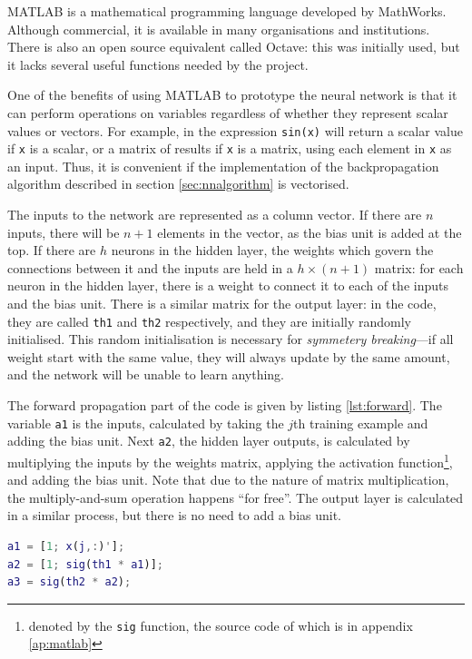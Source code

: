 MATLAB is a mathematical programming language developed by MathWorks.  Although commercial, it is available in many organisations and institutions.  There is also an open source equivalent called Octave: this was initially used, but it lacks several useful functions needed by the project.

One of the benefits of using MATLAB to prototype the neural network is that it can perform operations on variables regardless of whether they represent scalar values or vectors.  For example, in the expression {\tt sin(x)} will return a scalar value if {\tt x} is a scalar, or a matrix of results if {\tt x} is a matrix, using each element in {\tt x} as an input.  Thus, it is convenient if the implementation of the backpropagation algorithm described in section \ref{sec:nnalgorithm} is vectorised.

The inputs to the network are represented as a column vector.  If there are $n$ inputs, there will be $n + 1$ elements in the vector, as the bias unit is added at the top.  If there are $h$ neurons in the hidden layer, the weights which govern the connections between it and the inputs are held in a $h \times (n + 1)$ matrix: for each neuron in the hidden layer, there is a weight to connect it to each of the inputs and the bias unit.  There is a similar matrix for the output layer: in the code, they are called {\tt th1} and {\tt th2} respectively, and they are initially randomly initialised.  This random initialisation is necessary for \emph{symmetery breaking}---if all weight start with the same value, they will always update by the same amount, and the network will be unable to learn anything.

The forward propagation part of the code is given by listing \ref{lst:forward}.  The variable {\tt a1} is the inputs, calculated by taking the $j$th training example and adding the bias unit.  Next {\tt a2}, the hidden layer outputs, is calculated by multiplying the inputs by the weights matrix, applying the activation function\footnote{denoted by the {\tt sig} function, the source code of which is in appendix \ref{ap:matlab}}, and adding the bias unit.  Note that due to the nature of matrix multiplication, the multiply-and-sum operation happens ``for free''.  The output layer is calculated in a similar process, but there is no need to add a bias unit.

\begin{lstlisting}[language=Matlab,label=lst:forward,caption={Forward propagation code},captionpos=b]
a1 = [1; x(j,:)'];
a2 = [1; sig(th1 * a1)];
a3 = sig(th2 * a2);
\end{lstlisting}


